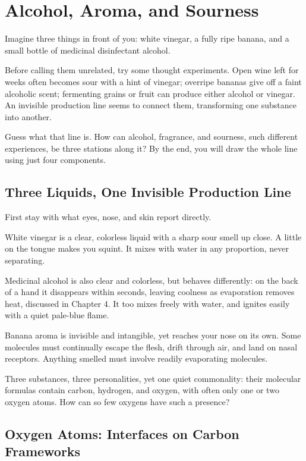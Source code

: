 \chapter{Alcohol, Aroma, and Sourness}

\begin{kaichang}
Imagine three things in front of you: white vinegar, a fully ripe banana, and a small bottle of medicinal disinfectant alcohol.

Before calling them unrelated, try some thought experiments. Open wine left for weeks often becomes sour with a hint of vinegar; overripe bananas give off a faint alcoholic scent; fermenting grains or fruit can produce either alcohol or vinegar. An invisible production line seems to connect them, transforming one substance into another.

Guess what that line is. How can alcohol, fragrance, and sourness, such different experiences, be three stations along it? By the end, you will draw the whole line using just four components.
\end{kaichang}

\section{Three Liquids, One Invisible Production Line}

First stay with what eyes, nose, and skin report directly.

White vinegar is a clear, colorless liquid with a sharp sour smell up close. A little on the tongue makes you squint. It mixes with water in any proportion, never separating.

Medicinal alcohol is also clear and colorless, but behaves differently: on the back of a hand it disappears within seconds, leaving coolness as evaporation removes heat, discussed in Chapter 4. It too mixes freely with water, and ignites easily with a quiet pale-blue flame.

Banana aroma is invisible and intangible, yet reaches your nose on its own. Some molecules must continually escape the flesh, drift through air, and land on nasal receptors. Anything smelled must involve readily evaporating molecules.

Three substances, three personalities, yet one quiet commonality: their molecular formulas contain carbon, hydrogen, and oxygen, with often only one or two oxygen atoms. How can so few oxygens have such a presence?

\section{Oxygen Atoms: Interfaces on Carbon Frameworks}

